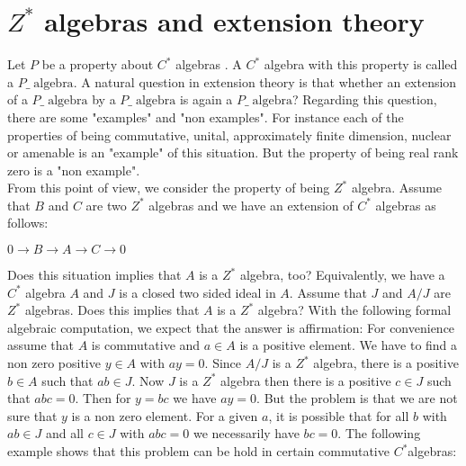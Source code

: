 \documentclass[a4paper,10pt]{amsart}
\theoremstyle{definition}
\theoremstyle{plain}
\begin{document}
 \section*{$Z^{*}$ algebras  and extension theory}
 Let $P$ be  a property about  $C^{*}$ algebras .  A  $C^{*}$  algebra with this  property is  called a
 $P\_ \;\text{algebra}$. A natural question in extension theory is that whether an extension of  a
 $P\_ \;\text{algebra}$ by  a  $P\_ \;\text{algebra}$ is  again a  $P\_ \;\text{algebra}$? Regarding this question, there are some "examples"  and  "non examples". For instance each of the properties of being commutative, unital,  approximately finite dimension,  nuclear or amenable is  an "example" of this situation. But the property of being real rank zero is a "non example". \\
 From this point of view, we consider the property of being $Z^{*}$ algebra. Assume that $B$ and $C$ are two $Z^{*}$ algebras and we have  an extension of $C^{*}$ algebras as follows:\\
 \begin{center}
 $0\rightarrow B\rightarrow A\rightarrow C \rightarrow 0$
 \end{center}
 Does  this  situation implies that $A$ is  a  $Z^{*}$  algebra, too? Equivalently, we have  a $C^{*}$  algebra $A$ and $J$ is a closed two sided ideal in $A$. Assume that $J$ and $A/J$  are $Z^{*}$  algebras. Does this implies that $A$ is  a
 $Z^{*}$  algebra? With the following  formal algebraic computation, we expect that the answer is affirmation: For  convenience assume that $A$ is  commutative and $a\in A$ is  a positive  element. We have to find a non zero positive $y\in A$ with $ay=0$. Since  $A/J$ is  a  $Z^{*}$  algebra, there is  a positive   $b\in A$ such that $ab \in J$. Now $J$ is  a $Z^{*}$ algebra then there is  a positive $c\in J$  such that $abc=0$. Then for $y=bc$ we have $ay=0$. But the problem is that we are not sure that $y$ is  a non zero element. For a given $a$, it is possible  that for all $b$ with $ab\in J$  and  all $c\in J$  with $abc=0$ we necessarily have $bc=0$. The  following example shows that this problem can be hold in certain commutative $C^{*}$algebras:
\end{document}
